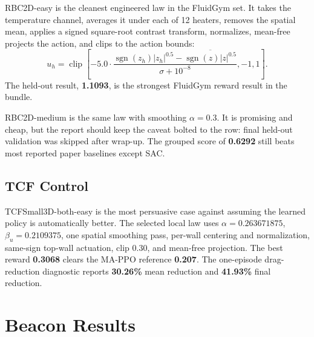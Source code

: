 \documentclass[10pt]{article}
\newcommand{\score}[1]{\textbf{#1}}
\begin{document}
RBC2D-easy is the cleanest engineered law in the FluidGym set. It takes the temperature channel, averages it under each of 12 heaters, removes the spatial mean, applies a signed square-root contrast transform, normalizes, mean-free projects the action, and clips to the action bounds:
\[
u_h = \operatorname{clip}\left[-5.0 \cdot
\frac{\operatorname{sgn}(z_h)|z_h|^{0.5}-\overline{\operatorname{sgn}(z)|z|^{0.5}}}{\sigma+10^{-8}}, -1, 1\right].
\]
The held-out result, \score{1.1093}, is the strongest FluidGym reward result in the bundle.

RBC2D-medium is the same law with smoothing \(\alpha=0.3\). It is promising and cheap, but the report should keep the caveat bolted to the row: final held-out validation was skipped after wrap-up. The grouped score of \score{0.6292} still beats most reported paper baselines except SAC.

\subsection{TCF Control}

TCFSmall3D-both-easy is the most persuasive case against assuming the learned policy is automatically better. The selected local law uses \(\alpha=0.263671875\), \(\beta_u=0.2109375\), one spatial smoothing pass, per-wall centering and normalization, same-sign top-wall actuation, clip \(0.30\), and mean-free projection. The best reward \score{0.3068} clears the MA-PPO reference \score{0.207}. The one-episode drag-reduction diagnostic reports \score{30.26\%} mean reduction and \score{41.93\%} final reduction.

\section{Beacon Results}
\end{document}
